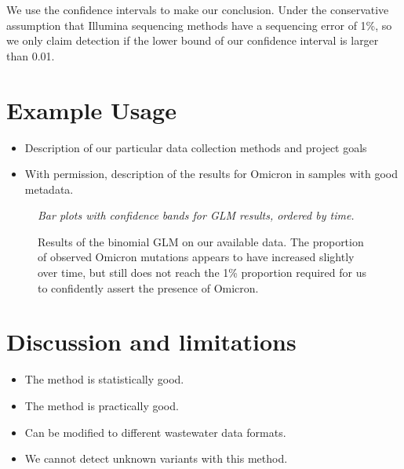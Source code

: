 \documentclass{article}
\newenvironment{tightemize}
{ \begin{itemize}
    \setlength{\itemsep}{0pt}
    \setlength{\parskip}{0pt}
    \setlength{\parsep}{0pt}     }
{ \end{itemize}                  }
\begin{document}
We use the confidence intervals to make our conclusion.
Under the conservative assumption that Illumina sequencing methods have a sequencing error of 1\%, so we only claim detection if the lower bound of our confidence interval is larger than 0.01.






\section{Example Usage}

\begin{tightemize}
    \item Description of our particular data collection methods and project goals
    \item With permission, description of the results for Omicron in samples with good metadata.
\end{tightemize}

\begin{figure}[ht!]
\vspace{2cm}
\centering
\emph{Bar plots with confidence bands for GLM results, ordered by time.}
\vspace{2cm}
\caption{Results of the binomial GLM on our available data. The proportion of observed Omicron mutations appears to have increased slightly over time, but still does not reach the 1\% proportion required for us to confidently assert the presence of Omicron.}
\label{fig:binomial_results}
\end{figure}


\section{Discussion and limitations}

\begin{tightemize}
    \item The method is statistically good.
    \item The method is practically good.
    \item Can be modified to different wastewater data formats.
    \item We cannot detect unknown variants with this method.
\end{tightemize}


{}

\end{document}
